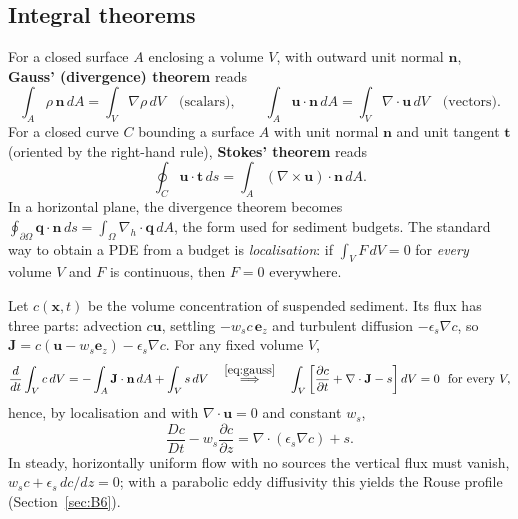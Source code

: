 \documentclass[11pt,letterpaper]{article}
\numberwithin{equation}{section}
\newcommand{\uu}{\mathbf{u}}
\newcommand{\xx}{\mathbf{x}}
\newcommand{\nn}{\mathbf{n}}
\newcommand{\qq}{\mathbf{q}}
\newcommand{\tv}{\mathbf{t}}
\newcommand{\e}[1]{\mathbf{e}_{#1}}
\newcommand{\pd}[2]{\frac{\partial #1}{\partial #2}}
\newcommand{\od}[2]{\frac{d #1}{d #2}}
\newcommand{\Dt}[1]{\frac{D #1}{Dt}}
\begin{document}
\subsection{Integral theorems}
For a closed surface $A$ enclosing a volume $V$, with outward unit normal $\nn$, \textbf{Gauss' (divergence) theorem}
reads \citep[p.~891]{kundu2016}
\begin{equation}\label{eq:gauss}
\int_A\rho\,\nn\,dA=\int_V\nabla\rho\,dV\quad\text{(scalars)},\qquad
\int_A\uu\cdot\nn\,dA=\int_V\nabla\cdot\uu\,dV\quad\text{(vectors)}.
\end{equation}
For a closed curve $C$ bounding a surface $A$ with unit normal $\nn$ and unit tangent $\tv$ (oriented by the right-hand
rule), \textbf{Stokes' theorem} reads
\begin{equation}\label{eq:stokesthm}
\oint_C\uu\cdot\tv\,ds=\int_A(\nabla\times\uu)\cdot\nn\,dA .
\end{equation}
In a horizontal plane, the divergence theorem becomes $\oint_{\partial\Omega}\qq\cdot\nn\,ds=\int_\Omega\nabla_h\cdot\qq\,dA$,
the form used for sediment budgets. The standard way to obtain a PDE from a budget is \emph{localisation}: if
$\int_V F\,dV=0$ for \emph{every} volume $V$ and $F$ is continuous, then $F=0$ everywhere.

\begin{worked}\label{we:sscequation}
Let $c(\xx,t)$ be the volume concentration of suspended sediment. Its flux has three parts: advection $c\uu$, settling
$-w_sc\,\e{z}$ and turbulent diffusion $-\epsilon_s\nabla c$, so $\mathbf J=c(\uu-w_s\e{z})-\epsilon_s\nabla c$. For any fixed
volume $V$,
\[
\od{}{t}\int_Vc\,dV=-\int_A\mathbf J\cdot\nn\,dA+\int_V s\,dV
\quad\overset{\eqref{eq:gauss}}{\Longrightarrow}\quad
\int_V\left[\pd{c}{t}+\nabla\cdot\mathbf J-s\right]dV=0\ \ \text{for every }V,
\]
hence, by localisation and with $\nabla\cdot\uu=0$ and constant $w_s$,
\begin{equation}\label{eq:ssc}
\Dt{c}-w_s\pd{c}{z}=\nabla\cdot(\epsilon_s\nabla c)+s .
\end{equation}
In steady, horizontally uniform flow with no sources the vertical flux must vanish, $w_sc+\epsilon_s\,dc/dz=0$; with a
parabolic eddy diffusivity this yields the Rouse profile (Section~\ref{sec:B6}).
\end{worked}
\end{document}
